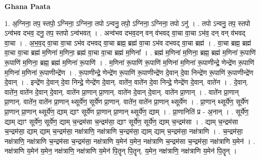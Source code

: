 \documentclass[17pt]{extarticle}
\begin{document}
\textbf{Ghana Paata } \newline

1. अ॒ग्निना॒ तप॒ स्तपो॒ ऽग्निना॒ ऽग्निना॒ तपो ऽन्वनु॒ तपो॒ ऽग्निना॒ ऽग्निना॒ तपो ऽनु॑ । . तपो ऽन्वनु॒ तप॒ स्तपो ऽन्व॑भव दभव॒ दनु॒ तप॒ स्तपो ऽन्व॑भवत् । . अन्व॑भव दभव॒दन् वन् व॑भवद् वा॒चा वा॒चा ऽभ॑व॒ दन् वन् व॑भवद् वा॒चा । . अ॒भ॒व॒द् वा॒चा वा॒चा ऽभ॑व दभवद् वा॒चा ब्रह्म॒ ब्रह्म॑ वा॒चा ऽभ॑व दभवद् वा॒चा ब्रह्म॑ । . वा॒चा ब्रह्म॒ ब्रह्म॑ वा॒चा वा॒चा ब्रह्म॑ म॒णिना॑ म॒णिना॒ ब्रह्म॑ वा॒चा वा॒चा ब्रह्म॑ म॒णिना᳚ । . ब्रह्म॑ म॒णिना॑ म॒णिना॒ ब्रह्म॒ ब्रह्म॑ म॒णिना॑ रू॒पाणि॑ रू॒पाणि॑ म॒णिना॒ ब्रह्म॒ ब्रह्म॑ म॒णिना॑ रू॒पाणि॑ । . म॒णिना॑ रू॒पाणि॑ रू॒पाणि॑ म॒णिना॑ म॒णिना॑ रू॒पाणीन्द्रे॒ णेन्द्रे॑ण रू॒पाणि॑ म॒णिना॑ म॒णिना॑ रू॒पाणीन्द्रे॑ण । . रू॒पाणीन्द्रे॒ णेन्द्रे॑ण रू॒पाणि॑ रू॒पाणीन्द्रे॑ण दे॒वान् दे॒वा निन्द्रे॑ण रू॒पाणि॑ रू॒पाणीन्द्रे॑ण दे॒वान् । . इन्द्रे॑ण दे॒वान् दे॒वा निन्द्रे॒ णेन्द्रे॑ण दे॒वान्. वाते॑न॒ वाते॑न दे॒वा निन्द्रे॒ णेन्द्रे॑ण दे॒वान्. वाते॑न । . दे॒वान्. वाते॑न॒ वाते॑न दे॒वान् दे॒वान्. वाते॑न प्रा॒णान् प्रा॒णान्. वाते॑न दे॒वान् दे॒वान्. वाते॑न प्रा॒णान् । . वाते॑न प्रा॒णान् प्रा॒णान्. वाते॑न॒ वाते॑न प्रा॒णान् थ्सूर्ये॑ण॒ सूर्ये॑ण प्रा॒णान्. वाते॑न॒ वाते॑न प्रा॒णान् थ्सूर्ये॑ण । . प्रा॒णान् थ्सूर्ये॑ण॒ सूर्ये॑ण प्रा॒णान् प्रा॒णान् थ्सूर्ये॑ण॒ द्याम् द्याꣳ सूर्ये॑ण प्रा॒णान् प्रा॒णान् थ्सूर्ये॑ण॒ द्याम् । . प्रा॒णानिति॑ प्र - अ॒नान् । . सूर्ये॑ण॒ द्याम् द्याꣳ सूर्ये॑ण॒ सूर्ये॑ण॒ द्याम् च॒न्द्रम॑सा च॒न्द्रम॑सा॒ द्याꣳ सूर्ये॑ण॒ सूर्ये॑ण॒ द्याम् च॒न्द्रम॑सा । . द्याम् च॒न्द्रम॑सा च॒न्द्रम॑सा॒ द्याम् द्याम् च॒न्द्रम॑सा॒ नक्ष॑त्राणि॒ नक्ष॑त्राणि च॒न्द्रम॑सा॒ द्याम् द्याम् च॒न्द्रम॑सा॒ नक्ष॑त्राणि । . च॒न्द्रम॑सा॒ नक्ष॑त्राणि॒ नक्ष॑त्राणि च॒न्द्रम॑सा च॒न्द्रम॑सा॒ नक्ष॑त्राणि य॒मेन॑ य॒मेन॒ नक्ष॑त्राणि च॒न्द्रम॑सा च॒न्द्रम॑सा॒ नक्ष॑त्राणि य॒मेन॑ । . नक्ष॑त्राणि य॒मेन॑ य॒मेन॒ नक्ष॑त्राणि॒ नक्ष॑त्राणि य॒मेन॑ पि॒तॄन् पि॒तॄन्. य॒मेन॒ नक्ष॑त्राणि॒ नक्ष॑त्राणि य॒मेन॑ पि॒तॄन् । \newline
\end{document}
